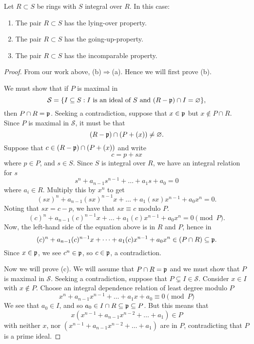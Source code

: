 \documentclass{ximera}
\begin{document}
\begin{theorem}[Going-up]
  Let $R\subset S$ be rings with $S$ integral over $R$. In this case:
  \begin{enumerate}
  \item The pair $R\subset S$ has the lying-over property.
  \item The pair $R\subset S$ has the going-up-property.
  \item The pair $R\subset S$ has the incomparable property.
  \end{enumerate}
  \begin{proof}
    From our work above, (b)$\Rightarrow$(a). Hence we will first
    prove (b).

    We must show that if $P$ is maximal in
    \[
    \mathcal{S} = \{I\subseteq S: \text{$I$ is an ideal of $S$ and
      $(R-\mathfrak{p})\cap I = \varnothing$}\},
    \]
    then $P\cap R = \mathfrak{p}$. Seeking a contradiction, suppose that
    $x\in\mathfrak{p}$ but $x\notin P\cap R$. Since $P$ is maximal in
    $\mathcal{S}$, it must be that
    \[
    (R-\mathfrak{p})\cap(P + (x)) \ne \varnothing.
    \]
    Suppose that $c\in (R-\mathfrak{p})\cap (P + (x))$ and write
    \[
    c = p + sx
    \]
    where $p\in P$, and $s\in S$. Since $S$ is integral over $R$, we
    have an integral relation for $s$
    \[
    s^n + a_{n-1}s^{n-1} + \dots + a_1 s + a_0 = 0
    \]
    where $a_i\in R$. Multiply this by $x^n$ to get
    \[
    (sx)^n + a_{n-1}(sx)^{n-1}x + \dots + a_1 (sx)x^{n-1} + a_0x^n = 0.
    \]
    Noting that $sx = c-p$, we have that $sx\equiv c$ modulo $P$.
    \[
    (c)^n + a_{n-1}(c)^{n-1}x + \dots + a_1 (c)x^{n-1} + a_0x^n = 0 \pmod{P}.
    \]
    Now, the left-hand side of the equation above is in $R$ and $P$,
    hence in
    \[
    (c)^n + a_{n-1}(c)^{n-1}x + \dots + a_1 (c)x^{n-1} + a_0x^n \in (P\cap R)\subseteq\mathfrak{p}. 
    \]
    Since $x\in\mathfrak{p}$, we see $c^n\in\mathfrak{p}$, so $c\in\mathfrak{p}$, a contradiction.


    Now we will prove (c). We will assume that $P\cap R = \mathfrak{p}$ and we
    must show that $P$ is maximal in $\mathcal{S}$. Seeking a
    contradiction, suppose that $P\subsetneq
    I\in\mathcal{S}$. Consider $x\in I$ with $x\notin P$. Choose an
    integral dependence relation of least degree modulo $P$
    \[
    x^n + a_{n-1}x^{n-1} + \dots + a_1 x + a_0 \equiv 0 \pmod{P}
    \]
    We see that $a_0\in I$, and so $a_0\in I \cap R \subseteq \mathfrak{p} \subseteq P$. But this means that
    \[
    x(x^{n-1} + a_{n-1}x^{n-2} + \dots + a_1)\in P
    \]
    with neither $x$, nor $(x^{n-1} + a_{n-1}x^{n-2} + \dots + a_1)$
    are in $P$, contradicting that $P$ is a prime ideal.
  \end{proof}
\end{theorem}
\end{document}
